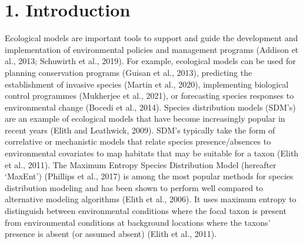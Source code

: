\documentclass[12pt,]{article}
\begin{document}
\setlength\parindent{24pt}

\hypertarget{introduction}{%
\section{1. Introduction}\label{introduction}}

Ecological models are important tools to support and guide the
development and implementation of environmental policies and management
programs (Addison et al., 2013; Schuwirth et al., 2019). For example,
ecological models can be used for planning conservation programs (Guisan
et al., 2013), predicting the establishment of invasive species (Martin
et al., 2020), implementing biological control programmes (Mukherjee et
al., 2021), or forecasting species responses to environmental change
(Bocedi et al., 2014). Species distribution models (SDM's) are an
example of ecological models that have become increasingly popular in
recent years (Elith and Leathwick, 2009). SDM's typically take the form
of correlative or mechanistic models that relate species
presence/absences to environmental covariates to map habitats that may
be suitable for a taxon (Elith et al., 2011). The Maximum Entropy
Species Distribution Model (hereafter `MaxEnt') (Phillips et al., 2017)
is among the most popular methods for species distribution modeling and
has been shown to perform well compared to alternative modeling
algorithms (Elith et al., 2006). It uses maximum entropy to distinguish
between environmental conditions where the focal taxon is present from
environmental conditions at background locations where the taxons'
presence is absent (or assumed absent) (Elith et al., 2011).
\end{document}
